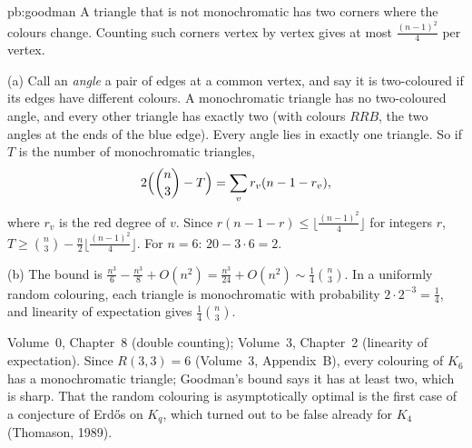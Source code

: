 \begin{solution}{pb:goodman}
\idea A triangle that is not monochromatic has two corners where the colours change. Counting such corners vertex by vertex
gives at most $\frac{(n-1)^2}4$ per vertex.

\writeup (a) Call an \emph{angle} a pair of edges at a common vertex, and say it is two-coloured if its edges have different colours. A
monochromatic triangle has no two-coloured angle, and every other triangle has exactly two (with colours $RRB$, the two angles at
the ends of the blue edge). Every angle lies in exactly one triangle. So if $T$ is the number of monochromatic triangles,
\[
2\Bigl(\binom n3-T\Bigr)=\sum_vr_v(n-1-r_v),
\]
where $r_v$ is the red degree of $v$. Since $r(n-1-r)\le\lfloor\frac{(n-1)^2}4\rfloor$ for integers $r$, $T\ge\binom n3-\frac n2\lfloor\frac{(n-1)^2}4\rfloor$.
For $n=6$: $20-3\cdot6=2$.

(b) The bound is $\frac{n^3}6-\frac{n^3}8+O(n^2)=\frac{n^3}{24}+O(n^2)\sim\frac14\binom n3$. In a uniformly random colouring, each triangle is
monochromatic with probability $2\cdot2^{-3}=\frac14$, and linearity of expectation gives $\frac14\binom n3$.

\tools Volume~0, Chapter~8 (double counting); Volume~3, Chapter~2 (linearity of expectation).
\leads Since $R(3,3)=6$ (Volume~3, Appendix~B), every colouring of $K_6$ has a monochromatic triangle; Goodman's bound says
it has at least two, which is sharp. That the random colouring is asymptotically optimal is the first case of a
conjecture of Erdős on $K_q$, which turned out to be false already for $K_4$ (Thomason, 1989).
\end{solution}

